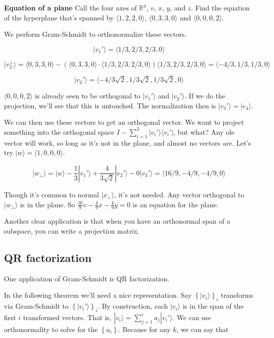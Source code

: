 \documentclass{amsbook}
\begin{document}
\begin{tcolorbox}[title=Example,colback=blue!5]
  {\bfseries\Large Equation of a plane}
Call the four axes of $\mathbb R^4$, $v$, $x$, $y$, and $z$.  Find the equation of the hyperplane that's spanned by $\langle 1,2,2,0\rangle$, $\langle 0,3,3,0\rangle$ and $\langle 0,0,0,2\rangle$.

We perform Gram-Schmidt to orthonormalize these vectors.

$$
|v_1'\rangle=\langle 1/3, 2/3, 2/3, 0\rangle
$$

$$
|v_2^\bot\rangle=\langle 0,3,3,0\rangle-\left(\langle 0,3,3,0\rangle\cdot\langle 1/3, 2/3, 2/3,0\rangle\right)\langle 1/3, 2/3, 2/3,0\rangle=\langle -4/3, 1/3, 1/3, 0\rangle
$$

$$
|v_2'\rangle=\langle -4/3\sqrt2, 1/3\sqrt2, 1/3\sqrt2, 0\rangle
$$

$\langle 0,0,0,2\rangle$ is already seen to be orthogonal to $|v_1'\rangle$ and $|v_2'\rangle$.  If we do the projection, we'll see that this is untouched.  The normalization then is $|v_3'\rangle=|e_4\rangle$.

We can then use these vectors to get an orthogonal vector.  We want to project something into the orthogonal space $I-\sum_{i=1}^3|v_i'\rangle\langle v_i'|$, but what?  Any ole vector will work, so long as it's not in the plane, and almost no vectors are.  Let's try $|w\rangle=\langle 1,0,0,0\rangle$.

$$
|w_\bot\rangle=|w\rangle-\frac{1}{3}|v_1'\rangle+\frac{4}{3\sqrt2}|v_2'\rangle-0|v_3'\rangle=\langle 16/9, -4/9, -4/9, 0\rangle
$$

Though it's common to normal $|x_\bot\rangle$, it's not needed.  Any vector orthogonal to $|w_\bot\rangle$ is in the plane.  So $\frac{16}{9}v-\frac{4}{9}x-\frac{4}{9}y=0$ is an equation for the plane.
\end{tcolorbox}

Another clear application is that when you have an orthonormal span of a subspace, you can write a projection matrix.

\subsection{QR factorization}
One application of Gram-Schmidt is QR factorization.

In the following theorem we'll need a nice representation.  Say $\left\{|v_i\rangle\right\}_i$ transforms via Gram-Schmidt to $\left\{|v_i'\rangle\right\}_i$.  By construction, each $|v_i\rangle$ is in the span of the first $i$ transformed vectors.  That is, $|v_i\rangle=\sum_{j=1}^i a_j|v_i'\rangle$.  We can use orthonormality to solve for the $\left\{a_i\right\}$.  Because for any $k$, we can say that 
\end{document}
